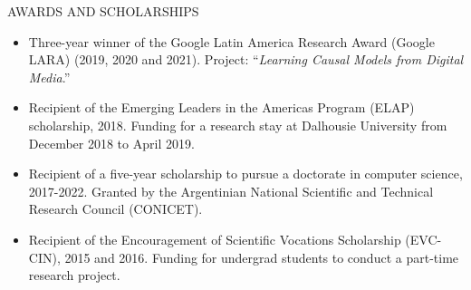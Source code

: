 \documentclass{resume} %
\begin{document}



\begin{rSection}{AWARDS AND SCHOLARSHIPS} 
\begin{itemize}
    \item Three-year winner of the Google Latin America Research Award (Google LARA) (2019, 2020 and 2021). Project: ``\textit{Learning Causal Models from Digital Media}.''
    \vspace{-0.2cm}     
    \item Recipient of the Emerging Leaders in the Americas Program (ELAP) scholarship, 2018. Funding for a research stay at Dalhousie University from December 2018 to April 2019.
    \vspace{-0.2cm}     
    \item Recipient of a five-year scholarship to pursue a doctorate in computer science, 2017-2022. Granted by the Argentinian National Scientific and Technical Research Council (CONICET).
    \vspace{-0.2cm}     
    \item Recipient of the Encouragement of Scientific Vocations Scholarship (EVC-CIN), 2015 and 2016. Funding for undergrad students to conduct a part-time research project.
\end{itemize}

\vspace{-0.2cm}
\end{rSection}


\end{document}
